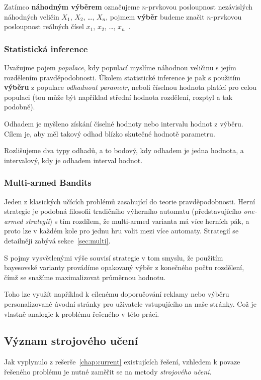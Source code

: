 \documentclass[thesis=M,czech]{FITthesis}[2014/05/07]
\begin{document}
Zatímco \textbf{náhodným výběrem} označujeme $n$-prvkovou posloupnost nezávislých náhodných veličin $X_1$, $X_2$, \ldots, $X_n$, pojmem \textbf{výběr} budeme značit $n$-prvkovou posloupnost reálných čísel $x_1$, $x_2$, \ldots, $x_n$~\cite{pst5}. 

\subsubsection{Statistická inference}
\label{inferno}
\cite{pst5} Uvažujme pojem \emph{populace}, kdy populací myslíme náhodnou veličinu s jejím rozdělením pravděpodobnosti. Úkolem statistické inference je pak s použitím \textbf{výběru} z populace \emph{odhadnout parametr}, neboli číselnou hodnota platící pro celou populaci (tou může být například střední hodnota rozdělení, rozptyl a tak podobně).

Odhadem je myšleno získání číselné hodnoty nebo intervalu hodnot z výběru. Cílem je, aby měl takový odhad blízko skutečné hodnotě parametru.

Rozlišujeme dva typy odhadů, a to bodový, kdy odhadem je jedna hodnota, a intervalový, kdy je odhadem interval hodnot. 

\subsubsection{Multi-armed Bandits}
\label{sub:mabandit}
Jeden z klasických učících problémů zasahující do teorie pravděpodobnosti. Herní strategie je podobná filosofii tradičního výherního automatu (představujícího \emph{one-armed strategii}) s tím rozdílem, že multi-armed varianta má více herních pák, a proto lze v každém kole pro jednu hru volit mezi více automaty. Strategií se detailněji zabývá sekce~\ref{sec:multi}.

S pojmy vysvětlenými výše souvisí strategie v tom smyslu, že použitím bayesovské varianty provádíme opakovaný výběr z konečného počtu rozdělení, čímž se snažíme maximalizovat průměrnou hodnotu.

Toho lze využít například k cílenému doporučování reklamy nebo výběru personalizované úvodní stránky pro uživatele vstupujícího na naše stránky. Což je vlastně analogie k problému řešeného v této práci.

\subsection{Význam strojového učení}
\label{sec:machine}

Jak vyplynulo z rešerše~\ref{chap:current} existujících řešení, vzhledem k povaze řešeného problému je nutné zaměřit se na metody \emph{strojového učení}. 
\end{document}
